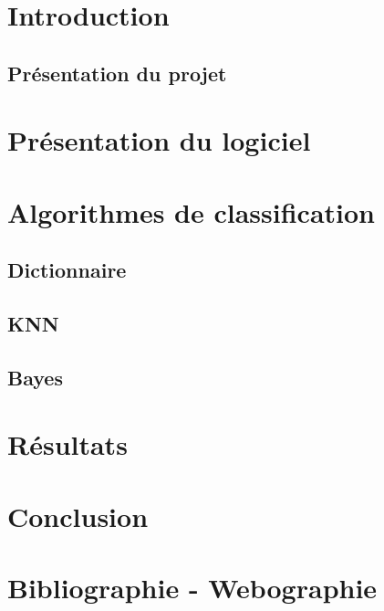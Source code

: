 \documentclass[pdftex,12pt,a4paper]{report}
\begin{document}
\begin{spacing}{1.2}

\tableofcontents

\chapter*{Introduction}


\section{Présentation du projet}

\chapter{Présentation du logiciel}

\chapter{Algorithmes de classification}

\section{Dictionnaire}

\section{KNN}

\section{Bayes}

\chapter{Résultats}

\chapter{Conclusion}

\chapter*{Bibliographie - Webographie}

\end{spacing}
\end{document}
